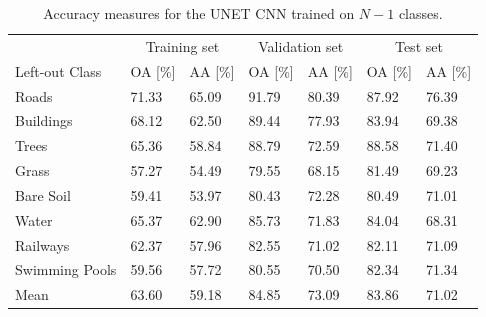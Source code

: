 \documentclass[10pt]{article}
\begin{document}
\begin{table}[H]
    \centering
    \begin{tabular}{lllllll}
    \toprule
                     & \multicolumn{2}{c}{Training set} & \multicolumn{2}{c}{Validation set} & \multicolumn{2}{c}{Test set}\\
    Left-out Class   & OA [\%]  & AA [\%] & OA [\%]  & AA [\%] & OA [\%]  & AA [\%]\\\midrule
    Roads          &     71.33 &     65.09 &   91.79 &   80.39 &    87.92 &    76.39 \\
    Buildings      &     68.12 &     62.50 &   89.44 &   77.93 &    83.94 &    69.38 \\
    Trees          &     65.36 &     58.84 &   88.79 &   72.59 &    88.58 &    71.40 \\
    Grass          &     57.27 &     54.49 &   79.55 &   68.15 &    81.49 &    69.23 \\
    Bare Soil      &     59.41 &     53.97 &   80.43 &   72.28 &    80.49 &    71.01 \\
    Water          &     65.37 &     62.90 &   85.73 &   71.83 &    84.04 &    68.31 \\
    Railways       &     62.37 &     57.96 &   82.55 &   71.02 &    82.11 &    71.09 \\
    Swimming Pools &     59.56 &     57.72 &   80.55 &   70.50 &    82.34 &    71.34 \\\midrule
    Mean           &  63.60 &  59.18 &  84.85 &  73.09 &  83.86 &  71.02 \\\bottomrule
    \end{tabular}
    \caption{Accuracy measures for the UNET \gls{CNN} trained on $N-1$ classes.}
    \label{table:zurich-cnn-acc-nd}
\end{table}
\end{document}
